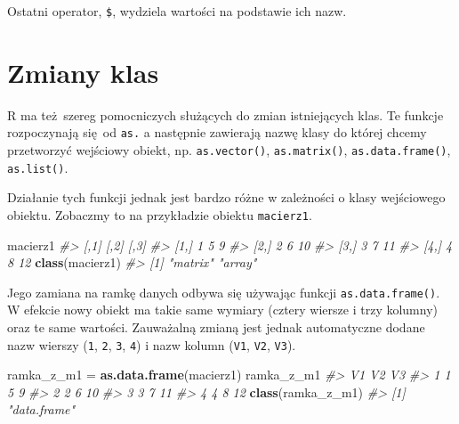 \documentclass[paper=6in:9in,pagesize=pdftex,headinclude=on,footinclude=on,10pt]{scrbook}
\newenvironment{Shaded}{\begin{snugshade}}{\end{snugshade}}
\newcommand{\CommentTok}[1]{\textcolor[rgb]{0.56,0.35,0.01}{\textit{#1}}}
\newcommand{\KeywordTok}[1]{\textcolor[rgb]{0.13,0.29,0.53}{\textbf{#1}}}
\newcommand{\NormalTok}[1]{#1}
\newcommand{\OperatorTok}[1]{\textcolor[rgb]{0.81,0.36,0.00}{\textbf{#1}}}
\newcommand{\StringTok}[1]{\textcolor[rgb]{0.31,0.60,0.02}{#1}}
\begin{document}
Ostatni operator, \texttt{\$}, wydziela wartości na podstawie ich nazw.

\begin{Shaded}
\end{Shaded}

\hypertarget{zmiany-klas}{%
\section{Zmiany klas}\label{zmiany-klas}}

R ma też~szereg pomocniczych służących do zmian istniejących klas.
Te funkcje rozpoczynają się~od \texttt{as.} a następnie zawierają nazwę klasy do której chcemy przetworzyć wejściowy obiekt, np. \texttt{as.vector()}, \texttt{as.matrix()}, \texttt{as.data.frame()}, \texttt{as.list()}.

Działanie tych funkcji jednak jest bardzo różne w zależności o klasy wejściowego obiektu.
Zobaczmy to na przykładzie obiektu \texttt{macierz1}.

\begin{Shaded}
\begin{Highlighting}[]
\NormalTok{macierz1}
\CommentTok{#>      [,1] [,2] [,3]}
\CommentTok{#> [1,]    1    5    9}
\CommentTok{#> [2,]    2    6   10}
\CommentTok{#> [3,]    3    7   11}
\CommentTok{#> [4,]    4    8   12}
\KeywordTok{class}\NormalTok{(macierz1)}
\CommentTok{#> [1] "matrix" "array"}
\end{Highlighting}
\end{Shaded}

Jego zamiana na ramkę danych odbywa się używając funkcji \texttt{as.data.frame()}.
W efekcie nowy obiekt ma takie same wymiary (cztery wiersze i trzy kolumny) oraz te same wartości.
Zauważalną zmianą jest jednak automatyczne dodane nazw wierszy (\texttt{1}, \texttt{2}, \texttt{3}, \texttt{4}) i nazw kolumn (\texttt{V1}, \texttt{V2}, \texttt{V3}).

\begin{Shaded}
\begin{Highlighting}[]
\NormalTok{ramka_z_m1 =}\StringTok{ }\KeywordTok{as.data.frame}\NormalTok{(macierz1)}
\NormalTok{ramka_z_m1}
\CommentTok{#>   V1 V2 V3}
\CommentTok{#> 1  1  5  9}
\CommentTok{#> 2  2  6 10}
\CommentTok{#> 3  3  7 11}
\CommentTok{#> 4  4  8 12}
\KeywordTok{class}\NormalTok{(ramka_z_m1)}
\CommentTok{#> [1] "data.frame"}
\end{Highlighting}
\end{Shaded}
\end{document}
